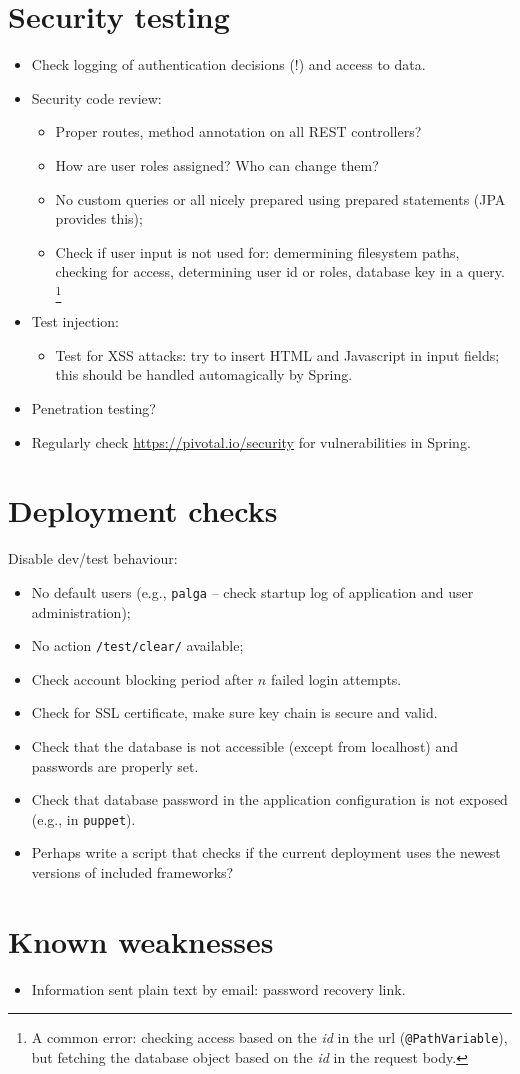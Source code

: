 \documentclass{report}
\begin{document}
\section{Security testing}
\begin{itemize}
\item Check logging of authentication decisions (!) and access to data.
\item Security code review:
\begin{itemize}
\item Proper routes, method annotation on all REST controllers?
\item How are user roles assigned? Who can change them?
\item No custom queries or all nicely prepared using prepared statements
(JPA provides this);
\item Check if user input is not used for:
demermining filesystem paths, checking for access, determining user id or roles,
database key in a query.%
\footnote{A common error: checking access based on the \emph{id} in the url
(\texttt{@PathVariable}),
but fetching the database object based on the \emph{id} in the request body.}
\end{itemize}
\item Test injection:
\begin{itemize}
\item Test for XSS attacks: try to insert HTML and Javascript in input fields;
this should be handled automagically by Spring.
\end{itemize}
\item Penetration testing?
\item Regularly check \url{https://pivotal.io/security} for vulnerabilities in Spring.
\end{itemize}


\section{Deployment checks}
Disable dev/test behaviour:
\begin{itemize}
\item No default users (e.g., \texttt{palga} -- check startup log of application and user administration);
\item No action \texttt{/test/clear/} available;
\item Check account blocking period after $n$ failed login attempts.
\item Check for SSL certificate, make sure key chain is secure and valid.
\item Check that the database is not accessible (except from localhost) and passwords are properly set.
\item Check that database password in the application configuration is not exposed (e.g., in \texttt{puppet}).
\item Perhaps write a script that checks if the current deployment uses the newest versions of included frameworks?
\end{itemize}


\section{Known weaknesses}
\begin{itemize}
\item Information sent plain text by email:
password recovery link.
\end{itemize}


%

\end{document}
